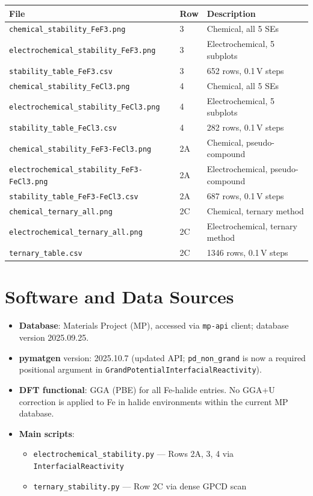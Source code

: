 \documentclass[11pt,letterpaper]{article}
\begin{document}
\begin{center}
\begin{tabular}{lll}
\toprule
File & Row & Description \\
\midrule
\texttt{chemical\_stability\_FeF3.png}         & 3 & Chemical, all 5 SEs \\
\texttt{electrochemical\_stability\_FeF3.png}  & 3 & Electrochemical, 5 subplots \\
\texttt{stability\_table\_FeF3.csv}            & 3 & 652 rows, 0.1\,V steps \\
\texttt{chemical\_stability\_FeCl3.png}        & 4 & Chemical, all 5 SEs \\
\texttt{electrochemical\_stability\_FeCl3.png} & 4 & Electrochemical, 5 subplots \\
\texttt{stability\_table\_FeCl3.csv}           & 4 & 282 rows, 0.1\,V steps \\
\texttt{chemical\_stability\_FeF3-FeCl3.png}        & 2A & Chemical, pseudo-compound \\
\texttt{electrochemical\_stability\_FeF3-FeCl3.png} & 2A & Electrochemical, pseudo-compound \\
\texttt{stability\_table\_FeF3-FeCl3.csv}           & 2A & 687 rows, 0.1\,V steps \\
\texttt{chemical\_ternary\_all.png}            & 2C & Chemical, ternary method \\
\texttt{electrochemical\_ternary\_all.png}     & 2C & Electrochemical, ternary method \\
\texttt{ternary\_table.csv}                    & 2C & 1346 rows, 0.1\,V steps \\
\bottomrule
\end{tabular}
\end{center}

\section{Software and Data Sources}

\begin{itemize}
  \item \textbf{Database}: Materials Project (MP), accessed via \texttt{mp-api}
        client; database version 2025.09.25.
  \item \textbf{pymatgen} version: 2025.10.7 (updated API; \texttt{pd\_non\_grand}
        is now a required positional argument in
        \texttt{GrandPotentialInterfacialReactivity}).
  \item \textbf{DFT functional}: GGA (PBE) for all Fe-halide entries.
        No GGA+U correction is applied to Fe in halide environments
        within the current MP database.
  \item \textbf{Main scripts}:
    \begin{itemize}
      \item \texttt{electrochemical\_stability.py} --- Rows 2A, 3, 4 via
            \texttt{InterfacialReactivity}
      \item \texttt{ternary\_stability.py} --- Row 2C via dense GPCD scan
    \end{itemize}
\end{itemize}
\end{document}
